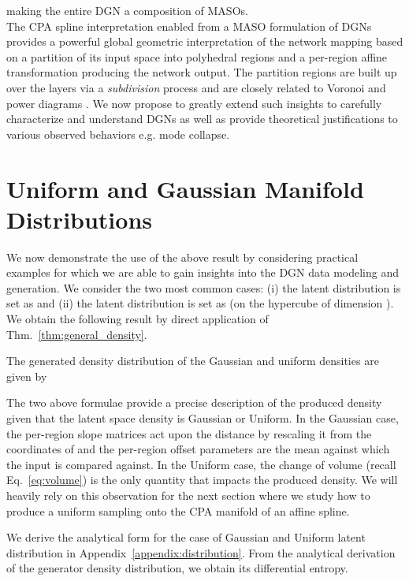 making the entire DGN a composition of MASOs.
\\
The CPA spline interpretation enabled from a MASO formulation of DGNs provides a powerful global geometric interpretation of the network mapping based on a partition of its input space  into polyhedral regions and a per-region affine transformation producing the network output. The partition regions are built up over the layers via a {\em subdivision} process and are closely related to Voronoi and power diagrams \citep{balestriero2019geometry}. We now propose to greatly extend such  insights to carefully characterize and understand DGNs as well as provide theoretical justifications to various observed behaviors e.g. mode collapse.


\section{Uniform and Gaussian Manifold Distributions}
\label{sec:appendix_distributions}


We now demonstrate the use of the above result by considering practical examples for which we are able to gain insights into the DGN data modeling and generation. We consider the two most common cases: (i) the latent distribution is set as   and (ii) the latent distribution is set as  (on the hypercube of dimension ). We obtain the following result by direct application of Thm.~\ref{thm:general_density}.


\begin{cor}
\label{cor:gaussian_density}
The generated density distribution  of the Gaussian and uniform densities are given by

\end{cor}


The two above formulae provide a precise description of the produced density given that the latent space density is Gaussian or Uniform. In the Gaussian case, the per-region slope matrices act upon the  distance by rescaling it from the coordinates of  and the per-region offset parameters  are the mean against which the input  is compared against. In the Uniform case, the change of volume (recall Eq.~\ref{eq:volume}) is the only quantity that impacts the produced density. We will heavily rely on this observation for the next section where we study how to produce a uniform sampling onto the CPA manifold of an affine spline.


We derive the analytical form for the case of Gaussian and Uniform latent distribution in Appendix~\ref{appendix:distribution}.
From the analytical derivation of the generator density distribution, we obtain its differential entropy.



